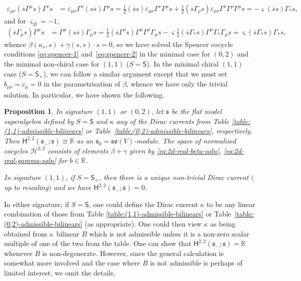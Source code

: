 \documentclass[pdftex]{sigma}
\numberwithin{equation}{section}
\newtheorem{Proposition}[Theorem]{Proposition}
 { \theoremstyle{definition}
\newtheorem{Definition}[Theorem]{Definition}
\newtheorem{Note}[Theorem]{Note}
\newtheorem{Example}[Theorem]{Example}
\newtheorem{Remark}[Theorem]{Remark} }
\newcommand{\fs}{\mathfrak{s}}
\newcommand{\fso}{\mathfrak{so}}
\newcommand{\RR}{\mathbb{R}}
\newcommand{\cH}{\mathcal{H}}
\newcommand{\ssH}{\mathsf{H}}
\newcommand{\ssS}{\mathsf{S}}
\newcommand{\1}{\mathbbm{1}}
\begin{document}
\begin{align*}
	\varepsilon_{\mu\nu}(\overline{s}\Gamma^\mu s)\Gamma^\nu s
		&= \varepsilon_{\mu\nu}\Gamma^\nu (s\overline{s})\Gamma^\mu s	= \frac{1}{2}(\overline{s}s)\varepsilon_{\mu\nu}\Gamma^\nu\Gamma^\mu s
			+ \frac{1}{2}(\overline{s}\Gamma_\rho s)\varepsilon_{\mu\nu}\Gamma^\nu\Gamma^\rho\Gamma^\mu s	= -\varsigma(\overline{s}s)\Gamma_*s,
\end{align*}
and for $\varsigma_B=-1$,
\begin{align*}
	(\overline{s}\Gamma_\mu s)\Gamma^\mu s
		&= \Gamma^\mu (s\overline{s})\Gamma_\mu s	= \frac{1}{2}(\overline{s}\Gamma^\rho s)\Gamma^\mu\Gamma^\rho\Gamma_\mu s - \varsigma\frac{1}{2}(\overline{s}\Gamma_* s)\Gamma^\mu\Gamma_*\Gamma_\mu s	= \varsigma(\overline{s}\Gamma_* s)\Gamma_* s,
\end{align*}
whence $\beta(\kappa_s,s) + \gamma(s,s)\cdot s=0$, so we have solved the Spencer cocycle conditions \eqref{eq:spencer-1} and~\eqref{eq:spencer-2} in the minimal case for $(0,2)$ and the minimal non-chiral case for $(1,1)$ ($S=\ssS$). In the minimal chiral $(1,1)$ case ($S=\ssS_+$), we can follow a similar argument except that we must set $b_{\mu\nu}=c_\mu=0$ in the parametrisation of $\beta$, whence we have only the trivial solution. In particular, we have shown the following.

\begin{Proposition}\label{prop:2d-real-spencer-soln}
	In signature $(1,1)$ or $(0,2)$, let $\fs$ be the flat model superalgebra defined by ${S=\ssS}$ and $\kappa$ any of the Dirac currents from Table {\rm\ref{table:(1,1)-admissible-bilinears}} or Table~{\rm\ref{table:(0,2)-admissible-bilinears}}, respectively. Then
${\ssH^{2,2}(\fs_-;\fs) \cong \RR}$
	as an $\fs_0=\fso(V)$-module. The space of normalised cocycles $\cH^{2,2}$ consists of elements $\beta+\gamma$ given by \eqref{eq:2d-real-beta-soln}, \eqref{eq:2d-real-gamma-soln} for $b\in\RR$.
	
In signature $(1,1)$, if $S=\ssS_+$, then there is a unique non-trivial Dirac current $($up to rescaling$)$ and we have
$\ssH^{2,2}(\fs_-;\fs) = 0$.
\end{Proposition}

In either signature, if $S=\ssS$, one could define the Dirac current $\kappa$ to be any linear combination of those from Table \ref{table:(1,1)-admissible-bilinears} or Table~\ref{table:(0,2)-admissible-bilinears} (as appropriate). One could then view $\kappa$ as being obtained from a~bilinear $B$ which is not admissible unless it is a non-zero scalar multiple of one of the two from the table. One can show that $\ssH^{2,2}(\fs_-;\fs)=\RR$ whenever $B$ is non-degenerate. However, since the general calculation is somewhat more involved and the case where $B$ is not admissible is perhaps of limited interest, we omit the details.
\end{document}

